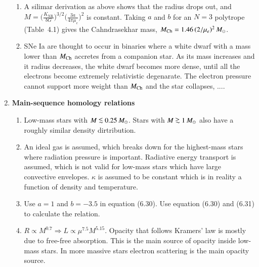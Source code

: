 \documentclass[11pt,a4paper,fleqn]{report}
\begin{document}
\begin{enumerate}
\begin{enumerate}
  \item A silimar derivation as above shows that the radius drops out,
    and \quad $\displaystyle M = \Bigg( \frac{K_\mathrm{NR}}{b G}
    \Bigg)^{3/2} \Bigg( \frac{3a}{4\pi\mu_e} \Bigg)^2$ is constant.
    Taking $a$ and $b$ for an $N=3$ polytrope (Table~4.1) gives the
    Cahndrasekhar mass, $M_{\rm Ch} = 1.46\, (2/\mu_e)^2\, {M}_\odot$.

  \item SNe Ia are thought to occur in binaries where a white dwarf
    with a mass lower than $M_{\rm Ch}$ accretes from a companion
    star. As its mass increases and it radius decreases, the white
    dwarf becomes more dense, until all the electrons become extremely
    relativistic degenarate. The electron pressure cannot support more
    weight than $M_{\rm Ch}$ and the star collapses, ....

  \end{enumerate}


\item {\bf Main-sequence homology relations}

  \begin {enumerate}	
    \addtocounter{enumii}{1}
	
  \item Low-mass stars with $M \lsim 0.25\,\Msun$. Stars with $M \gsim
    1\,\Msun$ also have a roughly similar density dirtribution.
	
  \item An ideal gas is assumed, which breaks down for the
    highest-mass stars where radiation pressure is important.
    Radiative energy transport is assumed, which is not valid for
    low-mass stars which have large convective envelopes. $\kappa$ is
    assumed to be constant which is in reality a function of density
    and temperature.
	
  \item Use $a=1$ and $b= -3.5$ in equation (6.30). Use equation
    (6.30) and (6.31) to calculate the relation.
	
  \item $R \propto M^{0.7} \Rightarrow L \propto \mu^{7.5} M^{5.15}$.
    Opacity that follows Kramers' law is mostly due to free-free
    absorption. This is the main source of opacity inside low-mass
    stars. In more massive stars electron scattering is the main
    opacity source.
	
  \end{enumerate}
  


\end{enumerate}
\end{document}
